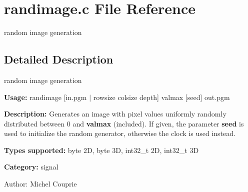 \section{randimage.c File Reference}
\label{randimage_8c}
random image generation 



\subsection{Detailed Description}
random image generation 

{\bf Usage:} randimage [in.pgm $|$ rowsize colsize depth] valmax [seed] out.pgm

{\bf Description:} Generates an image with pixel values uniformly randomly distributed between 0 and {\bf valmax} (included). If given, the parameter {\bf seed} is used to initialize the random generator, otherwise the clock is used instead.

{\bf Types supported:} byte 2D, byte 3D, int32\_\-t 2D, int32\_\-t 3D

{\bf Category:} signal

\begin{Desc}
\item[Author:]Michel Couprie \end{Desc}
